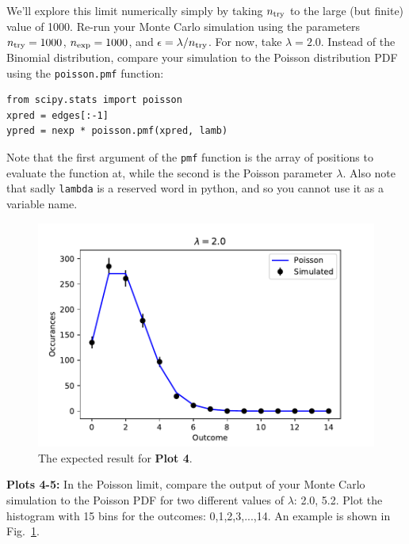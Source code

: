 We'll explore this limit numerically simply by taking $n_{\rm try}$ to
the large (but finite) value of 1000.  Re-run your Monte Carlo
simulation using the parameters $n_{\rm try} = 1000$, $n_{\rm exp} =
1000$, and $\epsilon = \lambda / n_{\rm try}$.  For now, take $\lambda
= 2.0$.  Instead of the Binomial distribution, compare your simulation to the Poisson distribution PDF
using the {\tt poisson.pmf} function:
\begin{verbatim}
from scipy.stats import poisson
xpred = edges[:-1]
ypred = nexp * poisson.pmf(xpred, lamb) 
\end{verbatim}
Note that the first argument of the {\tt pmf} function is the array of
positions to evaluate the function at, while the second is the Poisson
parameter $\lambda$.  Also note that sadly {\tt lambda} is a reserved word
in python, and so you cannot use it as a variable name.

\begin{figure}[htbp]
\begin{center}
\includegraphics[height=0.22\textheight]{figs/labs/distributions/poisson.pdf}
\end{center}
\caption{\label{fig:poisson} The expected result for {\bf Plot 4}. }
\end{figure}

{\bf Plots 4-5:}  In the Poisson limit, compare the output of your Monte Carlo simulation to the Poisson PDF
for two different values of $\lambda$:  2.0, 5.2.  Plot the histogram with 15 bins for the outcomes: 0,1,2,3,...,14.  
An example is shown in Fig.~\ref{fig:poisson}.


